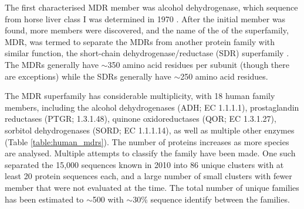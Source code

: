 \documentclass[a4paper, twoside, 12pt, openright]{report}
\begin{document}
The first characterised MDR member was alcohol dehydrogenase, which sequence from horse liver class I  was determined in 1970 \cite{jornvall_horse_1970-1}. After the initial member was found, more members were discovered, and the name of the of the superfamily, MDR, was termed to separate the MDRs from another protein family with similar function, the short-chain dehydrogenase/reductase (SDR)  superfamily \cite{persson_characteristics_1991}. The MDRs generally have $\sim$350 amino acid residues per subunit (though there are exceptions) while the SDRs generally have $\sim$250 amino acid residues\cite{persson_characteristics_1991}.
 
The MDR superfamily has considerable multiplicity, with 18 human family members, including the alcohol dehydrogenases (ADH; EC 1.1.1.1), prostaglandin reductases (PTGR; 1.3.1.48),  quinone oxidoreductases (QOR; EC 1.3.1.27),  sorbitol dehydrogenases (SORD; EC 1.1.1.14),  as well as multiple other enzymes (Table \ref{table:human_mdrs}). The number of proteins increases as more species are analysed. Multiple attempts to classify the family have been made. One such separated the 15,000 sequences known in 2010 into 86 unique clusters with at least 20 protein sequences each\cite{hedlund_subdivision_2010}, and a large number of small clusters with fewer member that were not evaluated at the time. The total number of unique families has been estimated to $\sim$500 with $\sim$30\% sequence identify between the families\cite{persson_medium-_2008}.
\end{document}
